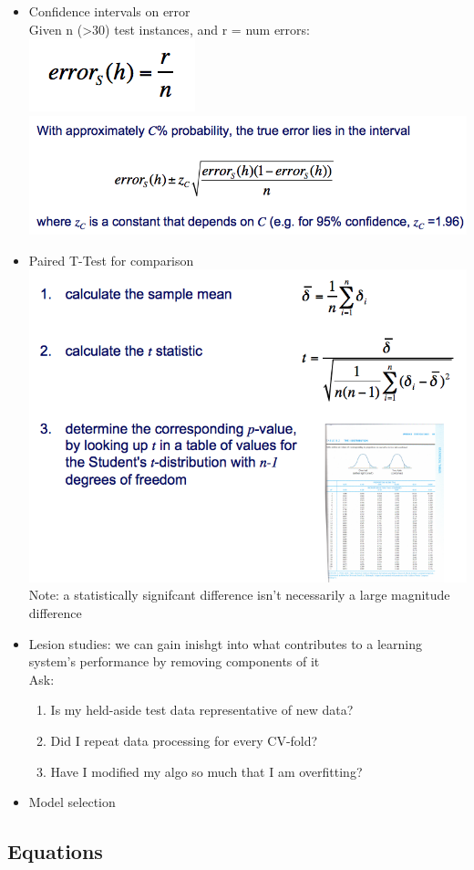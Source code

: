 \documentclass[a4paper]{article}
\begin{document}
\begin{itemize}
\item Confidence intervals on error \\
  Given n (>30) test instances, and r = num errors: \\
  \includegraphics[scale=0.75]{cierr} \\
  \includegraphics[scale=0.75]{cierr2}

\item Paired T-Test for comparison \\
  \includegraphics{ttest} \\
  Note: a statistically signifcant difference isn't necessarily a
  large magnitude difference

\item Lesion studies: we can gain inishgt into what contributes to a
  learning system's performance by removing components of it \\
  Ask:
  \begin{enumerate}
  \item Is my held-aside test data representative of new data?
  \item Did I repeat data processing for every CV-fold?
  \item Have I modified my algo so much that I am overfitting?
  \end{enumerate}

\item Model selection
  
  
\end{itemize}

\subsection{Equations}
    
\end{document}

